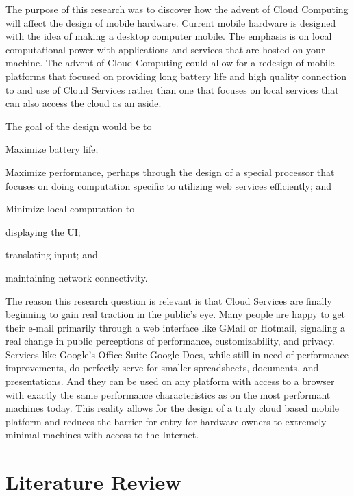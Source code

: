 \documentclass[12pt,oneside,letterpaper,titlepage]{report}
\begin{document}

The purpose of this research was to discover how the advent of Cloud Computing
will affect the design of mobile hardware.  Current mobile hardware is designed
with the idea of making a desktop computer mobile.  The emphasis is on local
computational power with applications and services that are hosted on your
machine.  The advent of Cloud Computing could allow for a redesign of mobile
platforms that focused on providing long battery life and high quality
connection to and use of Cloud Services rather than one that focuses on local
services that can also access the cloud as an aside.

The goal of the design would be to
\begin{inparaenum}[(1)]
\item Maximize battery life;
\item Maximize performance, perhaps through the design of a special processor
  that focuses on doing computation specific to utilizing web services
  efficiently; and
\item Minimize local computation to
  \begin{inparaenum}[(a)]
  \item displaying the UI;
  \item translating input; and
  \item maintaining network connectivity.
  \end{inparaenum}
\end{inparaenum}


The reason this research question is relevant is that Cloud Services are finally
beginning to gain real traction in the public's eye.  Many people are happy to
get their e-mail primarily through a web interface like GMail or Hotmail,
signaling a real change in public perceptions of performance, customizability,
and privacy.  Services like Google's Office Suite Google Docs, while still in
need of performance improvements, do perfectly serve for smaller spreadsheets,
documents, and presentations.  And they can be used on any platform with access
to a browser with exactly the same performance characteristics as on the most
performant machines today.  This reality allows for the design of a truly cloud
based mobile platform and reduces the barrier for entry for hardware owners to
extremely minimal machines with access to the Internet.

\chapter{Literature Review}
\end{document}
